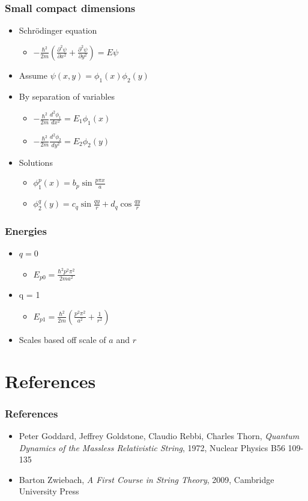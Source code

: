 \documentclass{beamer}
\begin{document}
\begin{frame}
\frametitle{Small compact dimensions}
\begin{itemize}
\item{Schr\"{o}dinger equation}
\begin{itemize}
\item{$-\frac{\hbar^2}{2m}(\frac{\partial^2\psi}{\partial x^2} + \frac{\partial^2 \psi}{\partial y^2})=E\psi$}
\end{itemize}
\item{Assume $\psi(x,y) = \phi_1(x)\phi_2(y)$}
\item{By separation of variables}
\begin{itemize}
\item{$-\frac{\hbar^2}{2m}\frac{d^2\phi_1}{dx^2} = E_1\phi_1(x)$}
\item{$-\frac{\hbar^2}{2m}\frac{d^2\phi_2}{dy^2} = E_2\phi_2(y)$}
\end{itemize}
\item{Solutions}
\begin{itemize}
\item{$\phi_1^p(x) = b_p \sin \frac{p\pi x}{a}$}
\item{$\phi_2^q(y) = c_q \sin \frac{q y}{r} + d_q\cos\frac{qy}{r}$}
\end{itemize}
\end{itemize}
\end{frame}

\begin{frame}
\frametitle{Energies}
\begin{itemize}
\item{$q=0$}
\begin{itemize}
\item{$E_{p0} = \frac{\hbar^2p^2\pi^2}{2ma^2}$}
\end{itemize}
\item{q = 1}
\begin{itemize}
\item{$E_{p1} = \frac{\hbar^2}{2m}(\frac{p^2\pi^2}{a^2} + \frac{1}{r^2})$}
\end{itemize}
\item{Scales based off scale of $a$ and $r$}
\end{itemize}
\end{frame}
\section{References}
\begin{frame}
 \frametitle{References}
\begin{itemize}
\item{Peter Goddard, Jeffrey Goldstone, Claudio Rebbi, Charles Thorn, \emph{Quantum Dynamics of the Massless Relativistic String}, 1972, Nuclear Physics B56 109-135
}
\item{Barton Zwiebach, \emph{A First Course in String Theory}, 2009, Cambridge University Press }
\end{itemize}
\end{frame}
\end{document}
